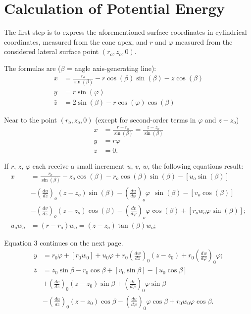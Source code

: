 \documentclass[11pt]{amsart}
\begin{document}
\section{Calculation of Potential Energy}

The first step is to express the aforementioned surface
coordinates in cylindrical coordinates, measured from the cone apex, and \(r\)
and \(\varphi\) measured from the considered lateral surface point \( (r_o,z_o, 0)\).

The formulas are (\(\beta \) = angle axis-generating line):
\begin{align}
x &= \frac{r_o}{\sin(\beta)} - r \cos(\beta) \sin(\beta) - z \cos(\beta) \nonumber \\
y &= r \sin(\varphi) \label{eq2} \\
\bar{z} &= 2 \sin(\beta ) - r \cos(\varphi) \cos(\beta) \nonumber
\end{align}

Near to the point \((r_o,z_o, 0)\) (except for
second-order terms in \(\varphi\) and \(z-z_o\))
\begin{align*}
x&= \frac{r-r_o}{\sin(\beta)}=
\frac{z-z_o}{\sin(\beta)} \\
y &= r \varphi \tag{2a} \\
\bar{z} & = 0.
\end{align*}

If \(r\), \(z\), \(\varphi\) each receive a small
increment \(u\), \(v\), \(w\), the following equations result:
\begin{align}
x &= \frac{r_o}{\sin(\beta)} -z_o \cos(\beta)
-r_o\cos(\beta)\sin(\beta) -[u_o\sin(\beta)] \nonumber \\
& -\left(\frac{d u}{dz}\right)_o (z-z_o) \sin(\beta) -
\left(\frac{d u}{d\varphi}\right)_o
\varphi ~~ \sin(\beta) -[v_o\cos(\beta)] \\
& -\left(\frac{d v}{dz}\right)_o (z-z_o)\cos(\beta) -
\left(\frac{d v}{d \varphi}\right)_o
\varphi \cos(\beta) + [r_o w_o \varphi \sin(\beta)]; \nonumber \\
u_o w_o &=(r-r_o)w_o = (z-z_o)\tan(\beta)w_o; \nonumber
\end{align}

Equation 3 continues on the next page.  \setcounter{equation}{2}
\begin{equation}\label{eq3p731}
\begin{aligned}
y & =r_0 \varphi+\left[r_0 w_0\right]+u_0 \varphi+r_0\left(\frac{d w}{d z}\right)_0\left(z-z_0\right)+r_0\left(\frac{d w}{d \varphi}\right)_0 \varphi; \\
\bar{z} & =z_0 \sin \beta-r_0 \cos \beta+\left[v_0 \sin \beta\right]-\left[u_0 \cos \beta\right] \\
& +\left(\frac{d v}{d z}\right)_0\left(z-z_0\right) \sin \beta+\left(\frac{d v}{d \varphi}\right)_0 \varphi \sin \beta \\
& -\left(\frac{d u}{d z}\right)_0\left(z-z_0\right) \cos \beta-\left(\frac{d u}{d \varphi}\right)_0 \varphi \cos \beta+r_0 w_0 \varphi \cos \beta .
\end{aligned}
\end{equation}
\end{document}
